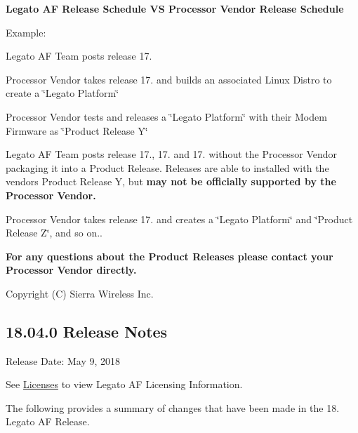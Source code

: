 {\bfseries  Legato AF Release Schedule VS Processor Vendor Release Schedule }



Example\+:
\begin{DoxyItemize}
\item Legato AF Team posts release 17.
\item Processor Vendor takes release 17. and builds an associated Linux Distro to create a \char`\"{}\+Legato
   Platform\char`\"{}
\item Processor Vendor tests and releases a \char`\"{}\+Legato Platform\char`\"{} with their Modem Firmware as \char`\"{}\+Product
   Release Y\char`\"{}
\item Legato AF Team posts release 17., 17. and 17. without the Processor Vendor packaging it into a Product Release. Releases are able to installed with the vendor\textquotesingle{}s Product Release Y, but {\bfseries  may not be officially supported by the Processor Vendor. }
\item Processor Vendor takes release 17. and creates a \char`\"{}\+Legato Platform\char`\"{} and \char`\"{}\+Product Release Z\char`\"{}, and so on..
\end{DoxyItemize}

{\bfseries For any questions about the Product Releases please contact your Processor Vendor directly.}

Copyright (C) Sierra Wireless Inc. \hypertarget{releaseNotes18040}{}\subsection{18.04.0 Release Notes}\label{releaseNotes18040}
Release Date\+: May 9, 2018

See \hyperlink{aboutLicenses}{Licenses} to view Legato AF Licensing Information.

The following provides a summary of changes that have been made in the 18. Legato AF Release.

